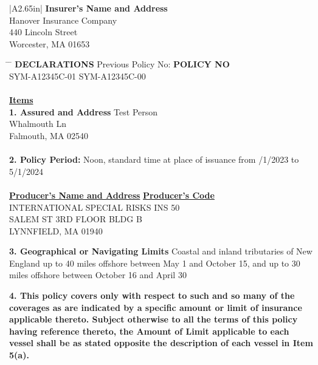 \documentclass[10pt]{article}
\begin{document}
\extramarks{}{}

\noindent \begin{tabular}{ |A{2.65in}| }
    \hline
    \textbf{Insurer's Name and Address} \\
    \hline
    Hanover Insurance Company \\
    440 Lincoln Street \\
    Worcester, MA 01653 \\
    \hline
\end{tabular}

\begin{tabbing}
    \hspace{3in} \= \hspace{1.75in} \= \kill
    \textbf{DECLARATIONS} \> Previous Policy No: \> \textbf{POLICY NO}\\
    \> SYM-A12345C-01 \> SYM-A12345C-00 \\
    \\
    \underline{\textbf{Items}} \\
    \textbf{1. Assured and Address} \> \> Test Person \\
    \>  Whalmouth Ln \\
    \> \> 
Falmouth, MA 02540
 \\
    \\
    \textbf{2. Policy Period:} Noon, standard time at place of issuance from \> /1/2023 to 5/1/2024 \\
    \\
    \underline{\textbf{Producer's Name and Address}} \> \underline{\textbf{Producer's Code}} \\
    INTERNATIONAL SPECIAL RISKS INS  50 \\
    SALEM ST 3RD FLOOR BLDG B \\
    LYNNFIELD, MA 01940 \\
\end{tabbing}

\noindent \textbf{3. 	Geographical or Navigating Limits}  Coastal and inland tributaries of New England up to 40 miles offshore between May 1 and October 15, and up to 30 miles offshore between October 16 and April 30
\vspace{\baselineskip}

\noindent \textbf{4.  This policy covers only with respect to such and so many of the coverages as are indicated by a specific amount or limit of insurance applicable thereto.  Subject otherwise to all the terms of this policy having reference thereto, the Amount of Limit applicable to each vessel shall be as stated opposite the description of each vessel in Item 5(a).}
\end{document}
